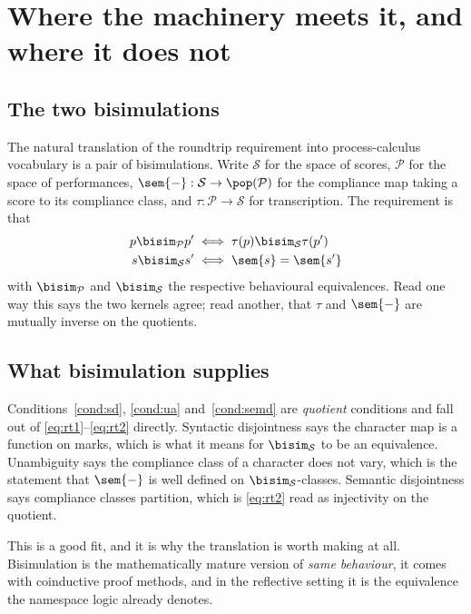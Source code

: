 \section{Where the machinery meets it, and where it does not}
\label{sec:bisim}

\subsection{The two bisimulations}

The natural translation of the roundtrip requirement into
process-calculus vocabulary is a pair of bisimulations.
Write $\mathcal{S}$ for the space of scores, $\mathcal{P}$ for the
space of performances, $\sem{-} : \mathcal{S} \to
\pop(\mathcal{P})$ for the compliance map taking a score to its
compliance class, and $\tau : \mathcal{P} \to \mathcal{S}$ for
transcription.
The requirement is that
\begin{align}
p \bisim_{\mathcal{P}} p' &\iff \tau(p) \bisim_{\mathcal{S}} \tau(p') \label{eq:rt1}\\
s \bisim_{\mathcal{S}} s' &\iff \sem{s} = \sem{s'} \label{eq:rt2}
\end{align}
with $\bisim_{\mathcal{P}}$ and $\bisim_{\mathcal{S}}$ the
respective behavioural equivalences.
Read one way this says the two kernels agree; read another, that
$\tau$ and $\sem{-}$ are mutually inverse on the quotients.

\subsection{What bisimulation supplies}

Conditions~\ref{cond:sd}, \ref{cond:ua} and~\ref{cond:semd} are
\emph{quotient} conditions and fall out of
\eqref{eq:rt1}--\eqref{eq:rt2} directly.
Syntactic disjointness says the character map is a function on
marks, which is what it means for $\bisim_{\mathcal{S}}$ to be an
equivalence.
Unambiguity says the compliance class of a character does not vary,
which is the statement that $\sem{-}$ is well defined on
$\bisim_{\mathcal{S}}$-classes.
Semantic disjointness says compliance classes partition, which is
\eqref{eq:rt2} read as injectivity on the quotient.

This is a good fit, and it is why the translation is worth making
at all.
Bisimulation is the mathematically mature version of \emph{same
behaviour}, it comes with coinductive proof methods, and in the
reflective setting it is the equivalence the namespace logic
already denotes.

